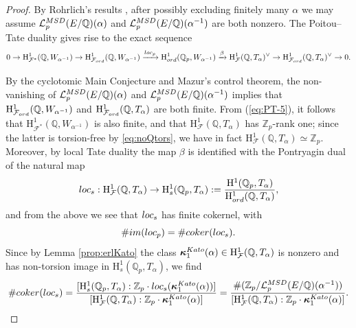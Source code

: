 \documentclass[10pt,reqno]{amsart}
\numberwithin{equation}{section}
\theoremstyle{plain}
\theoremstyle{definition}
\theoremstyle{definition}
\theoremstyle{plain}
\theoremstyle{plain}
\theoremstyle{plain}
\theoremstyle{plain}
\theoremstyle{plain}
\theoremstyle{plain}
\newcommand{\Z}{\mathbb{Z}}
\newcommand{\Q}{\mathbb{Q}}
\newcommand{\Zp}{\mathbb{Z}_{p}}
\newcommand{\bkappa}{\boldsymbol{\kappa}}
\newcommand{\Lcal}{\mathcal{L}}
\newcommand{\Fcal}{\mathcal{F}}
\newcommand{\rH}{\mathrm{H}}
\begin{document}
\begin{proof}%
By Rohrlich's results \cite{rohrlich-cyc}, after possibly excluding finitely many $\alpha$ we may assume  $\Lcal_p^{\rm MSD}(E/\Q)(\alpha)$ and $\Lcal_p^{\rm MSD}(E/\Q)(\alpha^{-1})$ are both nonzero. 
The Poitou--Tate duality gives rise to the exact sequence
\begin{equation}\label{eq:PT-5}
0\rightarrow\rH^1_{\Fcal^*}(\Q,W_{\alpha^{-1}})\rightarrow\rH^1_{\Fcal_{\rm ord}}(\Q,W_{\alpha^{-1}})\xrightarrow{{\rm loc}_p}\rH^1_{\rm ord}(\Q_p,W_{\alpha^{-1}})\xrightarrow{\beta}\rH^1_{\Fcal}(\Q,T_{\alpha})^\vee\rightarrow\rH^1_{\Fcal_{\rm ord}}(\Q,T_{\alpha})^\vee\rightarrow 0.
\end{equation}

By the cyclotomic Main Conjecture and Mazur's control theorem, the non-vanishing of $\Lcal_p^{\rm MSD}(E/\Q)(\alpha)$ and $\Lcal_p^{\rm MSD}(E/\Q)(\alpha^{-1})$ implies that $\rH^1_{\Fcal_{\rm ord}}(\Q,W_{\alpha^{-1}})$ and $\rH^1_{\Fcal_{\rm ord}}(\Q,T_{\alpha})$ are both finite. From (\ref{eq:PT-5}), it follows that $\rH^1_{\Fcal^*}(\Q,W_{\alpha^{-1}})$ is also finite, and that $\rH^1_{\Fcal}(\Q,T_{\alpha})$ has $\Z_p$-rank one; since the latter is torsion-free by \eqref{eq:noQtors}, we have in fact $\rH^1_{\Fcal}(\Q,T_{\alpha})\simeq \Zp$. Moreover, by local Tate duality the map $\beta$  is identified with the Pontryagin dual of the natural map
\[
{\rm loc}_{s}:\rH^1_{\Fcal}(\Q,T_{\alpha})\rightarrow\rH^1_{s}(\Q_p,T_{\alpha}):=\frac{\rH^1(\Q_p,T_{\alpha})}{\rH^1_{\rm ord}(\Q,T_{\alpha})},
\]
and from the above we see that ${\rm loc}_{s}$ has finite cokernel, with
\begin{equation}\label{eq:local-tate}
\#{\rm im}({\rm loc}_p)=\#{\rm coker}({\rm loc}_{s}).
\end{equation}
Since by Lemma \ref{prop:erlKato} the class $\bkappa^{\rm Kato}_{1}(\alpha)\in\rH^1_{\Fcal}(\Q,T_{\alpha})$ is nonzero and has non-torsion image in $\rH^1_{s}(\Q_p,T_{\alpha})$, we find %
\begin{equation}\label{eq:kato-erl}
\#{\rm coker}({\rm loc}_s)=\frac{[\rH^1_{s}(\Q_p,T_{\alpha}):\Z_p\cdot{\rm loc}_s(\bkappa_1^{\rm Kato}(\alpha))]}{[\rH^1_{\Fcal}(\Q,T_{\alpha}):\Z_p\cdot\bkappa_1^{\rm Kato}(\alpha)]}=
\frac{\#(\Z_p/\Lcal_p^{\rm MSD}(E/\Q)(\alpha^{-1}))}{[\rH^1_{\Fcal}(\Q,T_{\alpha}):\Z_p\cdot\bkappa^{\rm Kato}_1(\alpha)]}.
\end{equation} 


\end{proof}
\end{document}
